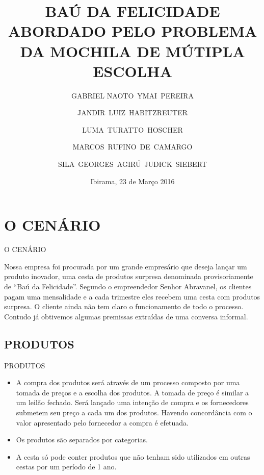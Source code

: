 \documentclass[	english,			%
	brazil,]{beamer}
\title[BAÚ DA FELICIDADE]{BAÚ DA FELICIDADE ABORDADO PELO PROBLEMA DA MOCHILA DE MÚTIPLA ESCOLHA}
\author[]{GABRIEL NAOTO~YMAI~PEREIRA \and JANDIR~LUIZ~HABITZREUTER \and LUMA~TURATTO~HOSCHER \and MARCOS~RUFINO~DE~CAMARGO \and SILA~GEORGES~AGIRÚ~JUDICK~SIEBERT}
\institute{UDESC-CEAVI}
\date{Ibirama, 23 de Março 2016}
\begin{document}
\begin{frame}
  \titlepage
\end{frame}


\section{O CENÁRIO}

\begin{frame}{O CENÁRIO}

Nossa empresa foi procurada por um grande empresário que deseja lançar um produto inovador, uma cesta de produtos surpresa denominada provisoriamente de “Baú da Felicidade”. Segundo o empreendedor Senhor Abravanel, os clientes pagam uma mensalidade e a cada trimestre eles recebem uma cesta com produtos surpresa. O cliente ainda não tem claro o funcionamento de todo o processo. Contudo já obtivemos algumas premissas extraídas de uma conversa informal.


\end{frame}

\subsection{PRODUTOS}

\begin{frame}{PRODUTOS}

\begin{itemize}
\item A compra dos produtos será através de um processo composto por uma tomada de preços e a escolha dos produtos. A tomada de preço é similar a um leilão fechado. Será lançado uma intenção de compra e os fornecedores submetem seu preço a cada um dos produtos. Havendo concordância com o valor apresentado pelo fornecedor a compra é efetuada.
\item Os produtos são separados por categorias.
\item A cesta só pode conter produtos que não tenham sido utilizados em outras cestas por um período de 1 ano.
\end{itemize}


\end{frame}
\end{document}
